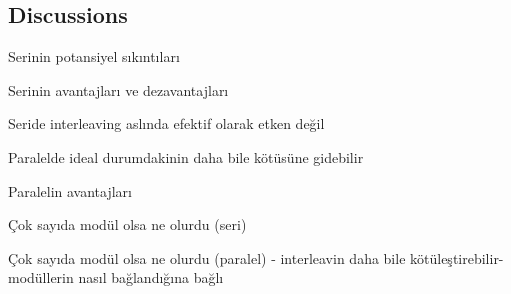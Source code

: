 \subsection{Discussions}

Serinin potansiyel sıkıntıları

Serinin avantajları ve dezavantajları

Seride interleaving aslında efektif olarak etken değil

Paralelde ideal durumdakinin daha bile kötüsüne gidebilir

Paralelin avantajları

Çok sayıda modül olsa ne olurdu (seri)

Çok sayıda modül olsa ne olurdu (paralel) - interleavin daha bile kötüleştirebilir- modüllerin nasıl bağlandığına bağlı
